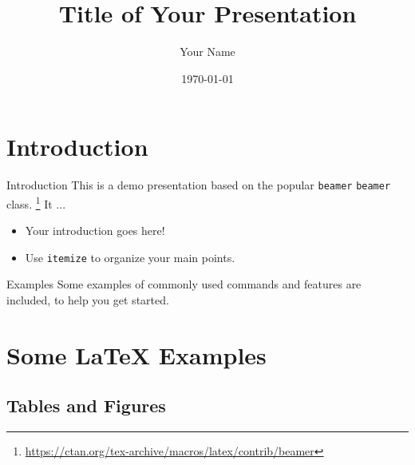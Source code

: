 \documentclass[
	hyperref={unicode},	%
	english
	]{beamer}
\title[Your Short Title]{Title of Your Presentation}
\author{Your Name}
\institute{Where You're From}
\date{\today}
\begin{document}
\begin{frame}
  \titlepage
\end{frame}


\section{Introduction}

\begin{frame}{Introduction}
This is a demo presentation based on the popular \texttt{\color{fg}beamer}
\texttt{beamer}
class.%
\footnote{\url{https://ctan.org/tex-archive/macros/latex/contrib/beamer}}
It ...

\begin{itemize}
  \item Your introduction goes here!
  \item Use \texttt{itemize} to organize your main points.
\end{itemize}

\vskip 1cm

\begin{block}{Examples}
Some examples of commonly used commands and features are included, to help you get started.
\end{block}

\end{frame}

\section{Some \LaTeX{} Examples}


\subsection{Tables and Figures}
\end{document}
